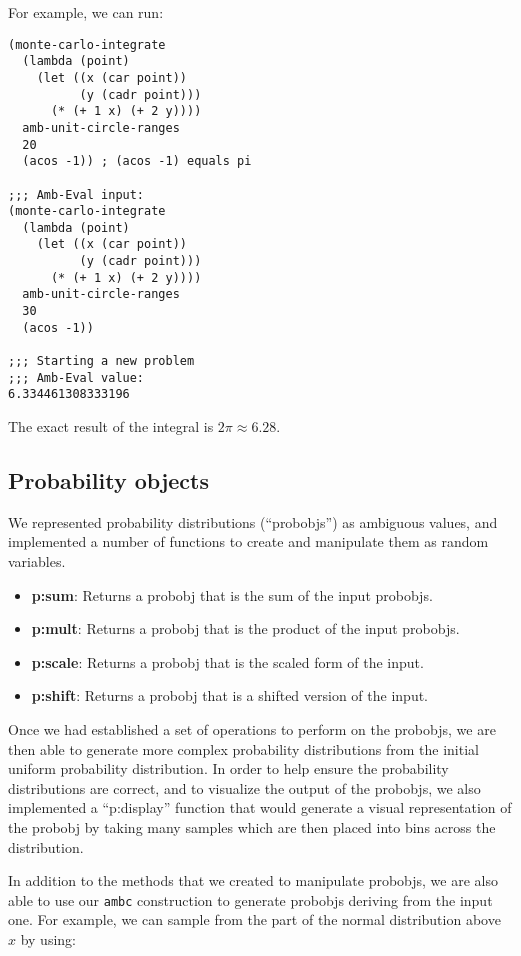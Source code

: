 \documentclass{article}
\begin{document}
For example, we can run:
\begin{lstlisting}
(monte-carlo-integrate
  (lambda (point)
    (let ((x (car point))
          (y (cadr point)))
      (* (+ 1 x) (+ 2 y))))
  amb-unit-circle-ranges
  20
  (acos -1)) ; (acos -1) equals pi

;;; Amb-Eval input:
(monte-carlo-integrate
  (lambda (point)
    (let ((x (car point))
          (y (cadr point)))
      (* (+ 1 x) (+ 2 y))))
  amb-unit-circle-ranges
  30
  (acos -1))

;;; Starting a new problem
;;; Amb-Eval value:
6.334461308333196
\end{lstlisting}
The exact result of the integral is $2\pi \approx 6.28$.

\subsection{Probability objects}

We represented probability distributions (``probobjs'') as ambiguous
values, and implemented a number of functions to create and manipulate
them as random variables.
\begin{itemize}
\item \textbf{p:sum}: Returns a {probobj} that is the sum of the input
  {probobj}s.
\item \textbf{p:mult}: Returns a {probobj} that is the product of the
  input {probobj}s.
\item \textbf{p:scale}: Returns a {probobj} that is the scaled form of
  the input.
\item \textbf{p:shift}: Returns a {probobj} that is a shifted version
  of the input.
\end{itemize}

Once we had established a set of operations to perform on the
{probobj}s, we are then able to generate more complex probability
distributions from the initial uniform probability distribution. In
order to help ensure the probability distributions are correct, and to
visualize the output of the {probobj}s, we also implemented a
``p:display'' function that would generate a visual representation of
the {probobj} by taking many samples which are then placed into bins
across the distribution.

In addition to the methods that we created to manipulate {probobj}s,
we are also able to use our \texttt{ambc} construction to generate
{probobj}s deriving from the input one. For example, we can sample
from the part of the normal distribution above $x$ by using:
\end{document}
